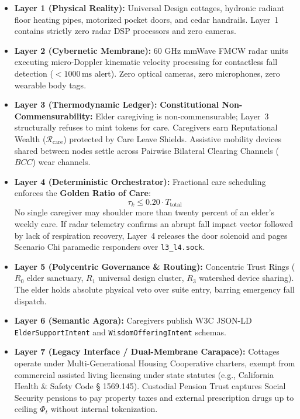 \begin{itemize}
    \item \textbf{Layer 1 (Physical Reality):} Universal Design cottages, hydronic radiant floor heating pipes, motorized pocket doors, and cedar handrails. Layer~1 contains strictly zero radar DSP processors and zero cameras.
    \item \textbf{Layer 2 (Cybernetic Membrane):} 60 GHz mmWave FMCW radar units executing micro-Doppler kinematic velocity processing for contactless fall detection ($< 1000\,\mathrm{ms}$ alert). Zero optical cameras, zero microphones, zero wearable body tags.
    \item \textbf{Layer 3 (Thermodynamic Ledger):} \textbf{Constitutional Non-Commensurability:} Elder caregiving is non-commensurable; Layer~3 structurally refuses to mint tokens for care. Caregivers earn Reputational Wealth ($\mathcal{R}_{\mathrm{care}}$) protected by Care Leave Shields. Assistive mobility devices shared between nodes settle across Pairwise Bilateral Clearing Channels ($BCC$) wear channels.
    \item \textbf{Layer 4 (Deterministic Orchestrator):} Fractional care scheduling enforces the \textbf{Golden Ratio of Care}:
    \[
    \tau_k \le 0.20 \cdot T_{\mathrm{total}}
    \]
    No single caregiver may shoulder more than twenty percent of an elder's weekly care. If radar telemetry confirms an abrupt fall impact vector followed by lack of respiration recovery, Layer~4 releases the door solenoid and pages Scenario Chi paramedic responders over \texttt{l3\_l4.sock}.
    \item \textbf{Layer 5 (Polycentric Governance \& Routing):} Concentric Trust Rings ($R_0$ elder sanctuary, $R_1$ universal design cluster, $R_3$ watershed device sharing). The elder holds absolute physical veto over suite entry, barring emergency fall dispatch.
    \item \textbf{Layer 6 (Semantic Agora):} Caregivers publish W3C JSON-LD \texttt{ElderSupportIntent} and \texttt{WisdomOfferingIntent} schemas.
    \item \textbf{Layer 7 (Legacy Interface / Dual-Membrane Carapace):} Cottages operate under Multi-Generational Housing Cooperative charters, exempt from commercial assisted living licensing under state statutes (e.g., California Health \& Safety Code § 1569.145). Custodial Pension Trust captures Social Security pensions to pay property taxes and external prescription drugs up to ceiling $\Phi_t$ without internal tokenization.
\end{itemize}


